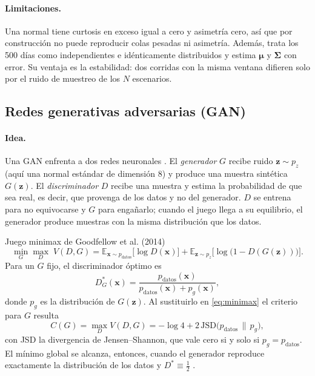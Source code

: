 \documentclass[12pt,letterpaper]{article}
\newcommand{\E}{\mathbb{E}}
\begin{document}
\paragraph{Limitaciones.}
Una normal tiene curtosis en exceso igual a cero y asimetría cero, así que por construcción no puede reproducir colas pesadas ni asimetría. Además, trata los 500 días como independientes e idénticamente distribuidos y estima $\bm\mu$ y $\bm\Sigma$ con error. Su ventaja es la estabilidad: dos corridas con la misma ventana difieren solo por el ruido de muestreo de los $N$ escenarios.

\subsection{Redes generativas adversarias (GAN)}

\paragraph{Idea.}
Una GAN enfrenta a dos redes neuronales \cite{goodfellow2014, googlegan}. El \emph{generador} $G$ recibe ruido $\mathbf z\sim p_z$ (aquí una normal estándar de dimensión 8) y produce una muestra sintética $G(\mathbf z)$. El \emph{discriminador} $D$ recibe una muestra y estima la probabilidad de que sea real, es decir, que provenga de los datos y no del generador. $D$ se entrena para no equivocarse y $G$ para engañarlo; cuando el juego llega a su equilibrio, el generador produce muestras con la misma distribución que los datos.

\begin{cajadef}{Juego minimax de Goodfellow et al. (2014)}
\begin{equation}\label{eq:minimax}
  \min_G\max_D\; V(D,G)=\E_{\mathbf x\sim p_{\text{datos}}}\big[\log D(\mathbf x)\big]+\E_{\mathbf z\sim p_z}\big[\log\big(1-D(G(\mathbf z))\big)\big].
\end{equation}
Para un $G$ fijo, el discriminador óptimo es
\begin{equation}\label{eq:dopt}
  D^*_G(\mathbf x)=\frac{p_{\text{datos}}(\mathbf x)}{p_{\text{datos}}(\mathbf x)+p_g(\mathbf x)},
\end{equation}
donde $p_g$ es la distribución de $G(\mathbf z)$. Al sustituirlo en \eqref{eq:minimax} el criterio para $G$ resulta
\begin{equation}
  C(G)=\max_D V(D,G)=-\log 4+2\,\mathrm{JSD}\big(p_{\text{datos}}\,\|\,p_g\big),
\end{equation}
con JSD la divergencia de Jensen--Shannon, que vale cero si y solo si $p_g=p_{\text{datos}}$. El mínimo global se alcanza, entonces, cuando el generador reproduce exactamente la distribución de los datos y $D^*\equiv\tfrac12$ \cite{goodfellow2014}.
\end{cajadef}
\end{document}
